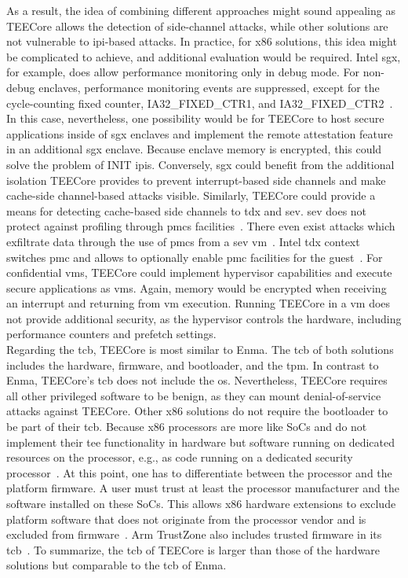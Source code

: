 As a result, the idea of combining different approaches might sound appealing as
TEECore allows the detection of side-channel attacks, while other solutions are
not vulnerable to \gls{ipi}-based attacks. In practice, for x86 solutions, this
idea might be complicated to achieve, and additional evaluation would be
required. Intel \gls{sgx}, for example, does allow performance monitoring only
in debug mode. For non-debug enclaves, performance monitoring events are
suppressed, except for the cycle-counting fixed counter, IA32\_FIXED\_CTR1, and
IA32\_FIXED\_CTR2~\cite{intel_sdm}. In this case, nevertheless, one possibility
would be for TEECore to host secure applications inside of \gls{sgx} enclaves
and implement the remote attestation feature in an additional \gls{sgx} enclave.
Because enclave memory is encrypted, this could solve the problem of INIT
\glspl{ipi}. Conversely, \gls{sgx} could benefit from the additional isolation
TEECore provides to prevent interrupt-based side channels and make cache-side
channel-based attacks visible. Similarly, TEECore could provide a means for
detecting cache-based side channels to \gls{tdx} and \gls{sev}. \gls{sev} does
not protect against profiling through \glspl{pmc}
facilities~\cite{kaplan_amd_2020}. There even exist attacks which exfiltrate
data through the use of \glspl{pmc} from a \gls{sev}
\gls{vm}~\cite{CounterSEVeillance}. Intel \gls{tdx} context switches \gls{pmc}
and allows to optionally enable \gls{pmc} facilities for the
guest~\cite{aktas2023intel}. For confidential \glspl{vm}, TEECore could
implement hypervisor capabilities and execute secure applications as \glspl{vm}.
Again, memory would be encrypted when receiving an interrupt and returning from
\gls{vm} execution. Running TEECore in a \gls{vm} does not provide additional
security, as the hypervisor controls the hardware, including performance
counters and prefetch settings.\\

Regarding the \gls{tcb}, TEECore is most similar to Enma. The \gls{tcb} of both
solutions includes the hardware, firmware, and bootloader, and the \gls{tpm}. In
contrast to Enma, TEECore's \gls{tcb} does not include the \gls{os}.
Nevertheless, TEECore requires all other privileged software to be benign, as
they can mount denial-of-service attacks against TEECore. Other x86 solutions do
not require the bootloader to be part of their \gls{tcb}. Because x86 processors
are more like SoCs and do not implement their \gls{tee} functionality in
hardware but software running on dedicated resources on the processor, e.g., as
code running on a dedicated security processor~\cite{xucode, kaplan_amd_2020}.
At this point, one has to differentiate between the processor and the platform
firmware. A user must trust at least the processor manufacturer and the software
installed on these SoCs. This allows x86 hardware extensions to exclude platform
software that does not originate from the processor vendor and is excluded from
firmware~\cite{xucode}. Arm TrustZone also includes trusted firmware in its
\gls{tcb}~\cite{pinto_demystifying_2019}. To summarize, the \gls{tcb} of TEECore
is larger than those of the hardware solutions but comparable to the \gls{tcb}
of Enma.

